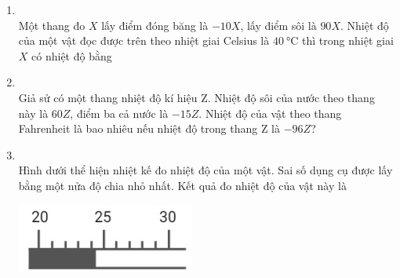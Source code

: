 \begin{enumerate}[label=\bfseries Câu \arabic*:, leftmargin=1.7cm]
\item {}\\
Một thang đo $X$ lấy điểm đóng băng là $-10X$, lấy điểm sôi là $90X$. Nhiệt độ của một vật đọc được trên theo nhiệt giai Celsius là $\SI{40}{\celsius}$ thì trong nhiệt giai $X$ có nhiệt độ bằng

\item{}\\
Giả sử có một thang nhiệt độ kí hiệu Z. Nhiệt độ sôi của nước theo thang này là $60Z$, điểm ba cả nước là $-15Z$. Nhiệt độ của vật theo thang Fahrenheit là bao nhiêu nếu nhiệt độ trong thang Z là $-96Z$?

\item{}\\
Hình dưới thể hiện nhiệt kế đo nhiệt độ của một vật. Sai số dụng cụ được lấy bằng một nửa độ chia nhỏ nhất. Kết quả đo nhiệt độ của vật này là
\begin{center}
	\includegraphics[width=0.25\linewidth]{../figs/VN12-Y24-PH-SYL-002P-3}
\end{center}


\end{enumerate}

